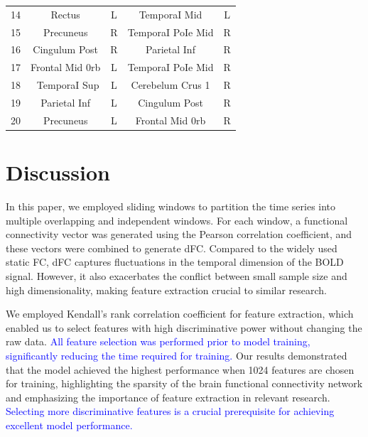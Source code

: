 \documentclass[a4paper]{cas-dc}
\begin{document}
\begin{table}[]
\begin{tabular*}{\tblwidth}{@{}ccccc@{}}
14          & Rectus             & L                            & TemporaI Mid           & L                                              \\
15          & Precuneus          & R                            & TemporaI PoIe Mid      & R                                              \\
16          & Cingulum Post      & R                            & Parietal Inf           & R                                              \\
17          & Frontal Mid 0rb    & L                            & TemporaI PoIe Mid      & R                                              \\
18          & ~TemporaI Sup      & L                            & Cerebelum Crus 1       & R                                              \\
19          & Parietal Inf       & L                            & Cingulum Post          & R                                              \\
20          & Precuneus          & L                            & Frontal Mid 0rb        & R   \\
		\bottomrule
	\end{tabular*}
\end{table}

\section{Discussion}
In this paper, we employed sliding windows to partition the time series into multiple overlapping and independent windows. For each window, a functional connectivity vector was generated using the Pearson correlation coefficient, and these vectors were combined to generate dFC. Compared to the widely used static FC, dFC captures fluctuations in the temporal dimension of the BOLD signal. However, it also exacerbates the conflict between small sample size and high dimensionality, making feature extraction crucial to similar research.

We employed Kendall's rank correlation coefficient for feature extraction, which enabled us to select features with high discriminative power without changing the raw data. \textcolor{blue}{All feature selection was performed prior to model training, significantly reducing the time required for training.} Our results demonstrated that the model achieved the highest performance when 1024 features are chosen for training, highlighting the sparsity of the brain functional connectivity network and emphasizing the importance of feature extraction in relevant research. \textcolor{blue}{Selecting more discriminative features is a crucial prerequisite for achieving excellent model performance.}
\end{document}
